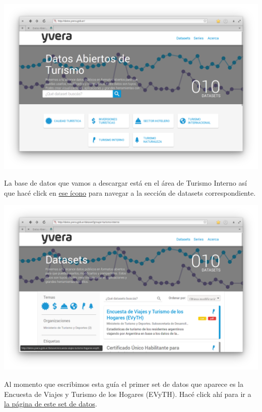 \documentclass[
  openany]{book}
\begin{document}
\begin{center}\includegraphics[width=1\linewidth]{img/yvera-principal} \end{center}

La base de datos que vamos a descargar está en el área de Turismo Interno así que hacé click en \href{http://datos.yvera.gob.ar/dataset?groups=turismo-interno}{ese ícono} para navegar a la sección de datasets correspondiente.



\begin{center}\includegraphics[width=1\linewidth]{img/yvera-interno} \end{center}

Al momento que escribimos esta guía el primer set de datos que aparece es la Encuesta de Viajes y Turismo de los Hogares (EVyTH). Hacé click ahí para ir a \href{http://datos.yvera.gob.ar/dataset/encuesta-viajes-turismo-hogares-evyth}{la página de este set de datos}.
\end{document}
